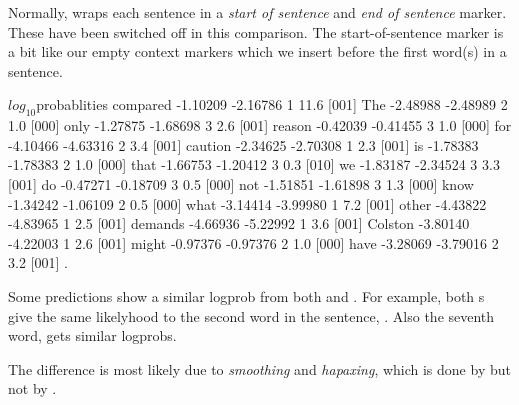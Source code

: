 \documentclass[a4paper,10pt,twoside]{report}
\begin{document}
Normally, \srilm{} wraps each sentence in a \emph{start of sentence}
and \emph{end of sentence} marker. These have been switched off in
this comparison. The start-of-sentence marker is a bit like
our empty context markers which we insert before the first word(s) in
a sentence. 

\begin{wout}{$log_{10}$probablities compared}
-1.10209 -2.16786 1   11.6 [001] The
-2.48988 -2.48989 2    1.0 [000] only
-1.27875 -1.68698 3    2.6 [001] reason
-0.42039 -0.41455 3    1.0 [000] for
-4.10466 -4.63316 2    3.4 [001] caution
-2.34625 -2.70308 1    2.3 [001] is
-1.78383 -1.78383 2    1.0 [000] that
-1.66753 -1.20412 3    0.3 [010] we
-1.83187 -2.34524 3    3.3 [001] do
-0.47271 -0.18709 3    0.5 [000] not
-1.51851 -1.61898 3    1.3 [000] know
-1.34242 -1.06109 2    0.5 [000] what
-3.14414 -3.99980 1    7.2 [001] other
-4.43822 -4.83965 1    2.5 [001] demands
-4.66936 -5.22992 1    3.6 [001] Colston
-3.80140 -4.22003 1    2.6 [001] might
-0.97376 -0.97376 2    1.0 [000] have
-3.28069 -3.79016 2    3.2 [001] .
\end{wout}

Some predictions show a similar logprob from both \wopr{} and
\srilm{}. For example, both \lm{}s give the same likelyhood to the
second word in the sentence, . Also the seventh word,
 gets similar logprobs. 

The difference is most likely due to \emph{smoothing} and
\emph{hapaxing}, which is done by \srilm{} but not by \wopr{}.

\end{document}
